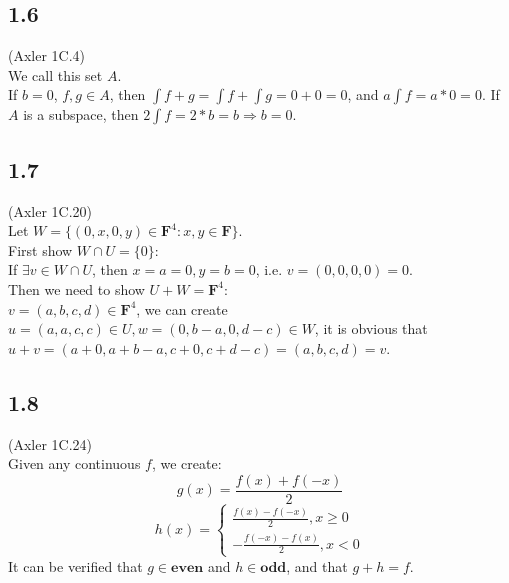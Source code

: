 \documentclass{article}
\begin{document}
\subsection{1.6}
(Axler 1C.4)\\
We call this set $A$.\\
If $b=0$, $f, g \in A$, then $\int f+g = \int f + \int g = 0 +0 = 0$, and $a \int f = a * 0 = 0$.
If $A$ is a subspace, then $2 \int f = 2 * b = b \Rightarrow b = 0$.
\subsection{1.7}
(Axler 1C.20)\\
Let $W = \{(0,x,0,y) \in \textbf{F}^4: x,y \in \textbf{F}\}$.\\
First show $W \cap U = \{0\}$:\\
If $\exists v \in W \cap U$, then $x = a = 0, y = b = 0$, i.e. $v = (0,0,0,0) = 0$.\\
Then we need to show $U + W = \textbf{F}^4$:\\
$v = (a, b, c, d) \in \textbf{F}^4$, we can create $u = (a, a, c, c) \in U, w = (0, b-a, 0, d-c) \in W$, it is obvious that $u + v = (a+0, a + b-a, c+0, c + d-c) = (a, b, c, d) = v$.\\

\subsection{1.8}
(Axler 1C.24)\\
Given any continuous $f$, we create:
\begin{equation*}
    g(x) = \frac{f(x)+f(-x)}{2}
\end{equation*}
\begin{equation*}
    h(x) = \left\{\begin{matrix}
    \frac{f(x)-f(-x)}{2}, x \geq 0\\
    -\frac{f(-x)-f(x)}{2}, x < 0
    \end{matrix}
\end{equation*}
It can be verified that $g \in \textbf{even}$ and $h \in \textbf{odd}$, and that $g + h = f$.
\end{document}
